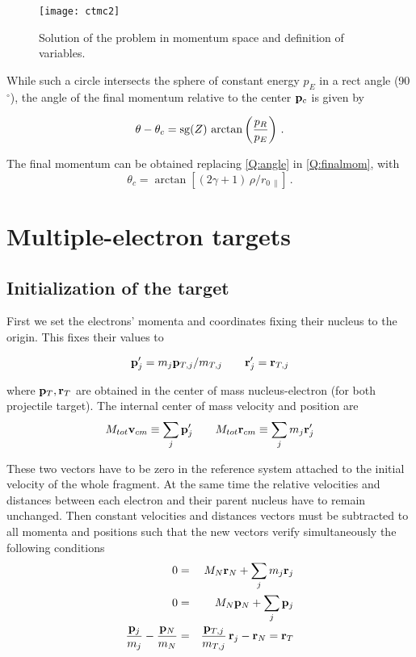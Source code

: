 \begin{figure}%
  \centering
 \texttt{[image: ctmc2]}
  \caption{Solution of the problem in momentum space and definition of
  variables.
  \label{f:ctmc2}}
\end{figure}

While such a circle intersects the sphere of constant energy $p_{E}$ in
a rect angle (90$^{\circ}$), the angle of the final momentum relative to the
center $\mathbf{p}_{c}$ is given by

\begin{equation}\label{Q:angle}
\theta - \theta_{c} = {\rm sg}(Z) \, \arctan{\left( \frac{p_{R}}{p_{E}}
\right)} \ .
\end{equation}

The final momentum can be obtained replacing \ref{Q:angle} in
\ref{Q:finalmom}, with
\[
\theta_{c} = \arctan\left[(2 \gamma + 1) \, \rho / r_{0\, \|} \right]
\,.
\]

\section{Multiple-electron targets}

\subsection{Initialization of the target}
\label{S:Initi-targe}

First we set the electrons' momenta and coordinates fixing their
nucleus to the origin. This fixes their values to

\[
\mathbf{p}'_{j} = m_{j} \mathbf{p}_{T,j}/m_{T,j} \qquad \mathbf{r}'_{j} =
\mathbf{r}_{T,j}
\]

where $\mathbf{p}_{T}, \mathbf{r}_{T}$ are obtained in the center of mass
nucleus-electron (for both projectile target). The internal center of
mass velocity and position are
%
\[
M_{tot} \mathbf{v}_{cm} \equiv \sum_{j} \mathbf{p}'_{j}  \qquad M_{tot}
\mathbf{r}_{cm} \equiv \sum_{j} m_{j} \mathbf{r}'_{j}
\]

These two vectors have to be zero in the reference system attached to
the initial velocity of the whole fragment. At the same time the
relative velocities and distances between each electron and their
parent nucleus have to remain unchanged. Then constant velocities and
distances vectors must be subtracted to all momenta and positions such
that the new vectors verify simultaneously the following conditions
\begin{eqnarray*}
  0 &=& M_{N} \mathbf{r}_{N} + \sum_{j} m_{j} \mathbf{r}_{j} \\
  0 &=& M_{N} \mathbf{p}_{N} + \sum_{j} \mathbf{p}_{j} \\
\frac{\mathbf{p}_{j}}{m_{j}} - \frac{\mathbf{p}_{N}}{m_{N}} &=&
\frac{\mathbf{p}_{T,j}}{m_{T,j}}\, \mathbf{r}_{j}-\mathbf{r}_{N} = \mathbf{r}_{T}
\end{eqnarray*}

